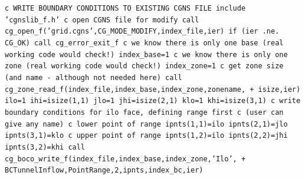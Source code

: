 \documentclass[12pt]{article}
\begin{document}
{\tt \noindent c  WRITE BOUNDARY CONDITIONS TO EXISTING CGNS FILE
\newline\indent      include 'cgnslib\_f.h'
\newline c  open CGNS file for modify
\newline\indent      call cg\_open\_f('grid.cgns',CG\_MODE\_MODIFY,index\_file,ier)
\newline\indent      if (ier .ne. CG\_OK) call cg\_error\_exit\_f
\newline c  we know there is only one base (real working code would check!)
\newline\indent      index\_base=1
\newline c  we know there is only one zone (real working code would check!)
\newline\indent      index\_zone=1
\newline c   get zone size (and name - although not needed here)
\newline\indent      call cg\_zone\_read\_f(index\_file,index\_base,index\_zone,zonename,
\newline + \indent isize,ier)
\newline\indent      ilo=1
\newline\indent      ihi=isize(1,1)
\newline\indent      jlo=1
\newline\indent      jhi=isize(2,1)
\newline\indent      klo=1
\newline\indent      khi=isize(3,1)
\newline c  write boundary conditions for ilo face, defining range first 
\newline c  (user can give any name)
\newline c  lower point of range
\newline\indent      ipnts(1,1)=ilo
\newline\indent      ipnts(2,1)=jlo
\newline\indent      ipnts(3,1)=klo
\newline c  upper point of range
\newline\indent      ipnts(1,2)=ilo
\newline\indent      ipnts(2,2)=jhi
\newline\indent      ipnts(3,2)=khi
\newline\indent      call cg\_boco\_write\_f(index\_file,index\_base,index\_zone,'Ilo',
\newline + \indent BCTunnelInflow,PointRange,2,ipnts,index\_bc,ier)
}
\end{document}
